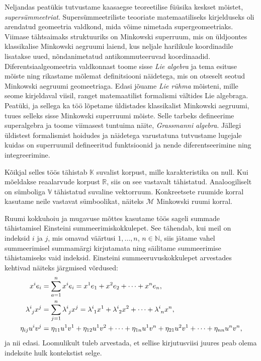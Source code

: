 \documentclass[12pt,a4paper,oneside]{article}
\theoremstyle{plain}
\theoremstyle{definition}
\numberwithin{equation}{section}
\def\N{{\mathbb N}}
\def\R{{\mathbb R}}
\def\K{{\mathbb K}}
\def\V{{\mathbb V}}
\def\M{{\mathcal M}}
\begin{document}
Neljandas peatükis tutvustame kaasaegse teoreetilise füüsika 
keskset mõistet, \emph{supersümmeetriat}. 
Supersümmeetriliste teooriate matemaatiliseks kirjelduseks 
oli arendatud geomeetria valdkond, mida võime nimetada 
supergeomeetriaks. \mbox{Viimase} tähtsaimaks struktuuriks on \mbox{Minkowski} superruum, 
mis on üldjoontes klassi\-kalise Minkowski aegruumi 
laiend, kus neljale harilikule koordinadile \mbox{lisatakse} uued, 
nõndanimetatud antikommuteeruvad koordinaadid.
Diferentsiaalgeomeetria valdkonnast toome sisse \emph{Lie algebra} 
ja tema esituse mõiste ning rikastame mõlemat definitsiooni 
näidetega, mis on otseselt seotud Minkowski aeg\-ruumi geomeetriaga. 
Edasi jõuame \emph{Lie rühma} mõisteni, mille seome 
kirjeldaval viisil, ranget matemaatilist formalismi vältides 
Lie algebraga. Peatüki, ja \mbox{sellega} ka töö lõpetame üldistades 
klassikalist Minkowski aegruumi, tuues selleks \mbox{sisse} Minkowski 
superruumi mõiste. Selle tarbeks defineerime superalgebra ja toome 
\mbox{viimasest} tuntuima näite, \emph{Grassmanni algebra}. Jällegi 
üldistest formalismist hoidudes ja näidetega varustatuna 
tutvustame lugejale kuidas on superruumil defi\-neeritud 
funktsioonid ja nende diferentseerimine ning integreerimine.

Kõikjal selles töös tähistab $\K$ suvalist korpust, mille
karakteristika on null. Kui mõeldakse reaalarvude korpust 
$\R$, siis on see vastavalt tähistatud. Analoogiliselt on 
sümboliga $\V$ tähistatud suvaline vektorruum. Konkreetsete 
ruumide korral \mbox{kasutame} neile vastavat süm\-boolikat, näiteks 
$\M$ Minkowski ruumi korral.

Ruumi kokkuhoiu ja mugavuse mõttes kasutame töös sageli 
summade tähista\-misel Einsteini summeerimiskokkulepet. 
See tähendab, kui meil on indeksid $i$ 
ja $j$, mis omavad väärtusi $1, \dots, n$, $n \in \N$, siis 
jätame vahel summeerimisel summamärgi kirjutamata 
ning säilitame summeerimise tähistamiseks vaid indeksid. 
Einsteini summeeruvuskokkulepet arvestades kehtivad näiteks 
järgmised võrdused:
\begin{align*}
x^{i} e_{i} &= \sum_{a=1}^{n} x^{i} e_{i} = 
	x^{1} e_{1} + x^{2} e_{2} + \dots + x^{n} e_{n}, \\
\lambda\indices{^i_j} x^{j} &= \sum_{j=1}^{n} 
	\lambda\indices{^i_j} x^{j} = \lambda\indices{^i_1} x^{1} + 
	\lambda\indices{^i_2} x^{2} + 
	\dots +\lambda\indices{^i_n} x^{n},\\
\eta_{ij} u^{i} v^{j} &= \eta_{11} u^{1} v^{1} + 
	\eta_{12} u^{1} v^{2} + \dots + \eta_{1n} u^{1} v^{n} + 
	\eta_{21} u^{2} v^{1} + \dots + \eta_{nn} u^{n} v^{n},
\end{align*}
ja nii edasi. Loomulikult tuleb arvestada, et sellise 
kirjutusviisi juures peab olema indeksite hulk kontekstist 
selge.
\end{document}
